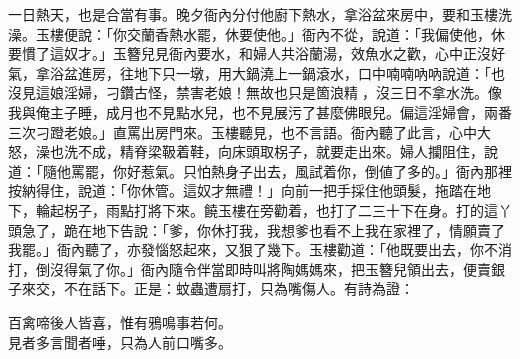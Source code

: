 一日熱天，也是合當有事。晚夕衙內分付他廚下熱水，拿浴盆來房中，要和玉樓洗澡。玉樓便說：「你交蘭香熱水罷，休要使他。」衙內不從，說道：「我偏使他，休要慣了這奴才。」玉簪兒見衙內要水，和婦人共浴蘭湯，效魚水之歡，心中正沒好氣，拿浴盆進房，往地下只一墩，用大鍋澆上一鍋滾水，口中喃喃吶吶說道：{}「也沒見這娘淫婦，刁鑽古怪，禁害老娘！無故也只是箇浪精𣭈，沒三日不拿水洗。像我與俺主子睡，成月也不見點水兒，也不見展污了甚麼佛眼兒。偏這淫婦會，兩番三次刁蹬老娘。」直罵出房門來。玉樓聽見，也不言語。衙內聽了此言，心中大怒，澡也洗不成，精脊梁靸着鞋，向床頭取柺子，就要走出來。婦人攔阻住，說道：「隨他罵罷，你好惹氣。只怕熱身子出去，風試着你，倒値了多的。」衙內那裡按納得住，說道：「你休管。這奴才無禮！」向前一把手採住他頭髮，拖踏在地下，輪起柺子，雨點打將下來。饒玉樓在旁勸着，也打了二三十下在身。打的這丫頭急了，跪在地下告說：「爹，你休打我，我想爹也看不上我在家裡了，情願賣了我罷。」衙內聽了，亦發惱怒起來，又狠了幾下。玉樓勸道：「他既要出去，你不消打，倒沒得氣了你。」衙內隨令伴當即時叫將陶媽媽來，把玉簪兒領出去，便賣銀子來交，不在話下。正是：蚊蟲遭扇打，只為嘴傷人。有詩為證：

\begin{myquote}
百禽啼後人皆喜，惟有鴉鳴事若何。\\見者多言聞者唾，只為人前口嘴多。
\end{myquote}


